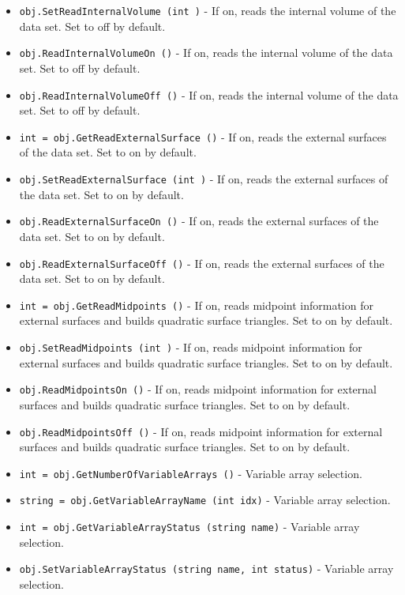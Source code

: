 \begin{itemize}
\item  \verb|obj.SetReadInternalVolume (int )| -  If on, reads the internal volume of the data set.  Set to off by default.

\item  \verb|obj.ReadInternalVolumeOn ()| -  If on, reads the internal volume of the data set.  Set to off by default.

\item  \verb|obj.ReadInternalVolumeOff ()| -  If on, reads the internal volume of the data set.  Set to off by default.

\item  \verb|int = obj.GetReadExternalSurface ()| -  If on, reads the external surfaces of the data set.  Set to on by default.

\item  \verb|obj.SetReadExternalSurface (int )| -  If on, reads the external surfaces of the data set.  Set to on by default.

\item  \verb|obj.ReadExternalSurfaceOn ()| -  If on, reads the external surfaces of the data set.  Set to on by default.

\item  \verb|obj.ReadExternalSurfaceOff ()| -  If on, reads the external surfaces of the data set.  Set to on by default.

\item  \verb|int = obj.GetReadMidpoints ()| -  If on, reads midpoint information for external surfaces and builds
 quadratic surface triangles.  Set to on by default.

\item  \verb|obj.SetReadMidpoints (int )| -  If on, reads midpoint information for external surfaces and builds
 quadratic surface triangles.  Set to on by default.

\item  \verb|obj.ReadMidpointsOn ()| -  If on, reads midpoint information for external surfaces and builds
 quadratic surface triangles.  Set to on by default.

\item  \verb|obj.ReadMidpointsOff ()| -  If on, reads midpoint information for external surfaces and builds
 quadratic surface triangles.  Set to on by default.

\item  \verb|int = obj.GetNumberOfVariableArrays ()| -  Variable array selection.

\item  \verb|string = obj.GetVariableArrayName (int idx)| -  Variable array selection.

\item  \verb|int = obj.GetVariableArrayStatus (string name)| -  Variable array selection.

\item  \verb|obj.SetVariableArrayStatus (string name, int status)| -  Variable array selection.

\end{itemize}
